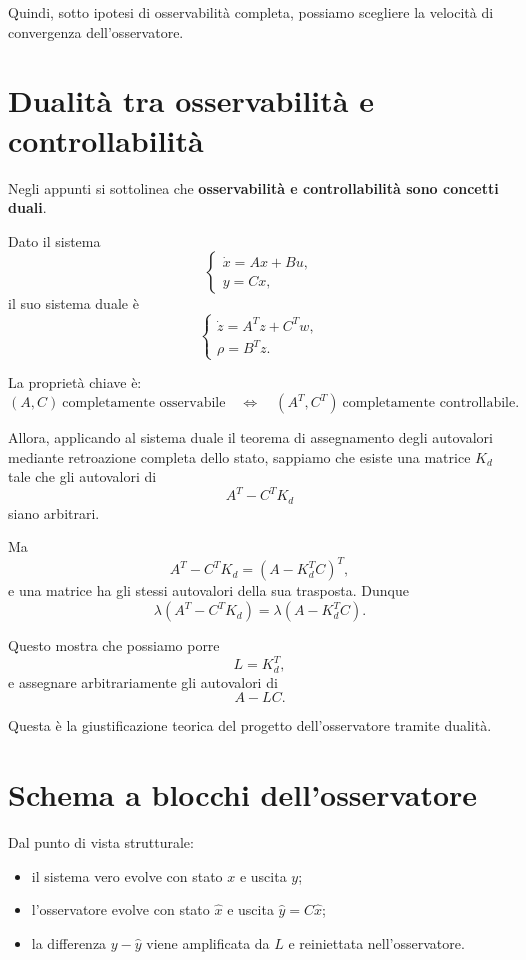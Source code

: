 Quindi, sotto ipotesi di osservabilità completa, possiamo scegliere la velocità
di convergenza dell'osservatore.

\section{Dualità tra osservabilità e controllabilità}

Negli appunti si sottolinea che \textbf{osservabilità e controllabilità sono concetti duali}.

Dato il sistema
\[
\begin{cases}
\dot x = Ax + Bu,\\
y = Cx,
\end{cases}
\]
il suo sistema duale è
\[
\begin{cases}
\dot z = A^T z + C^T w,\\[4pt]
\rho = B^T z.
\end{cases}
\]

La proprietà chiave è:
\[
(A,C)\ \text{completamente osservabile}
\quad\Longleftrightarrow\quad
(A^T,C^T)\ \text{completamente controllabile}.
\]

Allora, applicando al sistema duale il teorema di assegnamento degli autovalori
mediante retroazione completa dello stato, sappiamo che esiste una matrice \(K_d\)
tale che gli autovalori di
\[
A^T-C^T K_d
\]
siano arbitrari.

Ma
\[
A^T-C^T K_d = (A-K_d^T C)^T,
\]
e una matrice ha gli stessi autovalori della sua trasposta. Dunque
\[
\lambda(A^T-C^T K_d)=\lambda(A-K_d^T C).
\]

Questo mostra che possiamo porre
\[
L = K_d^T,
\]
e assegnare arbitrariamente gli autovalori di
\[
A-LC.
\]

Questa è la giustificazione teorica del progetto dell'osservatore tramite dualità.

\section{Schema a blocchi dell'osservatore}

Dal punto di vista strutturale:
\begin{itemize}
    \item il sistema vero evolve con stato \(x\) e uscita \(y\);
    \item l'osservatore evolve con stato \(\hat x\) e uscita \(\hat y=C\hat x\);
    \item la differenza \(y-\hat y\) viene amplificata da \(L\) e reiniettata nell'osservatore.
\end{itemize}

